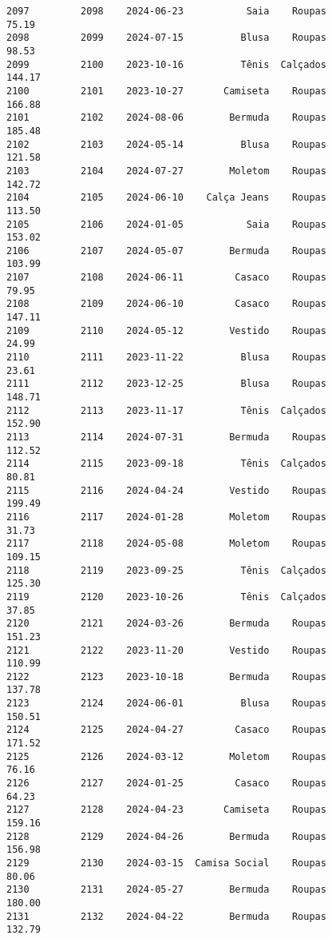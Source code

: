\documentclass[11pt]{article}
\begin{document}
\begin{Verbatim}[commandchars=\\\{\}]
2097         2098    2024-06-23           Saia    Roupas           75.19   
2098         2099    2024-07-15          Blusa    Roupas           98.53   
2099         2100    2023-10-16          Tênis  Calçados          144.17   
2100         2101    2023-10-27       Camiseta    Roupas          166.88   
2101         2102    2024-08-06        Bermuda    Roupas          185.48   
2102         2103    2024-05-14          Blusa    Roupas          121.58   
2103         2104    2024-07-27        Moletom    Roupas          142.72   
2104         2105    2024-06-10    Calça Jeans    Roupas          113.50   
2105         2106    2024-01-05           Saia    Roupas          153.02   
2106         2107    2024-05-07        Bermuda    Roupas          103.99   
2107         2108    2024-06-11         Casaco    Roupas           79.95   
2108         2109    2024-06-10         Casaco    Roupas          147.11   
2109         2110    2024-05-12        Vestido    Roupas           24.99   
2110         2111    2023-11-22          Blusa    Roupas           23.61   
2111         2112    2023-12-25          Blusa    Roupas          148.71   
2112         2113    2023-11-17          Tênis  Calçados          152.90   
2113         2114    2024-07-31        Bermuda    Roupas          112.52   
2114         2115    2023-09-18          Tênis  Calçados           80.81   
2115         2116    2024-04-24        Vestido    Roupas          199.49   
2116         2117    2024-01-28        Moletom    Roupas           31.73   
2117         2118    2024-05-08        Moletom    Roupas          109.15   
2118         2119    2023-09-25          Tênis  Calçados          125.30   
2119         2120    2023-10-26          Tênis  Calçados           37.85   
2120         2121    2024-03-26        Bermuda    Roupas          151.23   
2121         2122    2023-11-20        Vestido    Roupas          110.99   
2122         2123    2023-10-18        Bermuda    Roupas          137.78   
2123         2124    2024-06-01          Blusa    Roupas          150.51   
2124         2125    2024-04-27         Casaco    Roupas          171.52   
2125         2126    2024-03-12        Moletom    Roupas           76.16   
2126         2127    2024-01-25         Casaco    Roupas           64.23   
2127         2128    2024-04-23       Camiseta    Roupas          159.16   
2128         2129    2024-04-26        Bermuda    Roupas          156.98   
2129         2130    2024-03-15  Camisa Social    Roupas           80.06   
2130         2131    2024-05-27        Bermuda    Roupas          180.00   
2131         2132    2024-04-22        Bermuda    Roupas          132.79   

\end{Verbatim}
\end{document}
